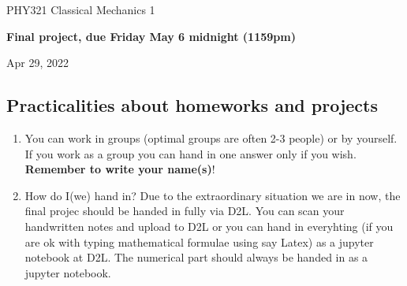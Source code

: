 \documentclass[%
oneside,                 %
final,                   %
10pt]{article}
\begin{document}

\newcommand{\exercisesection}[1]{\subsection*{#1}}






\thispagestyle{empty}

\begin{center}
{\LARGE\bf
\begin{spacing}{1.25}
PHY321 Classical Mechanics 1
\end{spacing}
}
\end{center}


\begin{center}
{\bf Final project, due Friday May 6 midnight (1159pm)${}^{}$} \\ [0mm]
\end{center}

\begin{center}
\end{center}
    

\begin{center}
Apr 29, 2022
\end{center}

\vspace{1cm}


\subsection*{Practicalities about  homeworks and projects}

\begin{enumerate}
\item You can work in groups (optimal groups are often 2-3 people) or by yourself. If you work as a group you can hand in one answer only if you wish. \textbf{Remember to write your name(s)}!

\item How do I(we)  hand in?  Due to the extraordinary situation we are in now, the final projec should be handed in fully via D2L. You can scan your handwritten notes and upload to D2L or you can hand in everyhting (if you are ok with typing mathematical formulae using say Latex) as a jupyter notebook at D2L. The numerical part should always be handed in as a jupyter notebook.
\end{enumerate}
\end{document}
